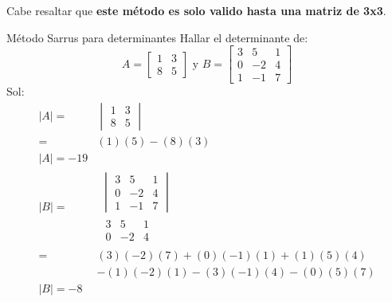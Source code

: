 Cabe resaltar que \textbf{este método es solo valido hasta una matriz de 3x3}.
\begin{Example*} {Método Sarrus para determinantes}
	Hallar el determinante de:
	$$
		A=\begin{bmatrix}
			1&3\\
			8&5
		\end{bmatrix}\text{ y } B=\begin{bmatrix}
			3&5&1\\
			0&-2&4\\
			1&-1&7
		\end{bmatrix}
	$$
	Sol:
	\begin{align*}
		|A|=&\begin{vmatrix}
				1&3\\
				8&5
			\end{vmatrix}\\
		=&(1)(5)-(8)(3)\\
		|A|=-19\\
		|B|=&\begin{array} {c}
			\begin{vmatrix}
				3&5&1\\
				0&-2&4\\
				1&-1&7
			\end{vmatrix}\\
			\begin{matrix}
				3&5&1\\
				0&-2&4
			\end{matrix}
		\end{array}\\
		=&(3)(-2)(7)+(0)(-1)(1)+(1)(5)(4)\\
		&-(1)(-2)(1)-(3)(-1)(4)-(0)(5)(7)\\
		|B|=-8
	\end{align*}
\end{Example*}
